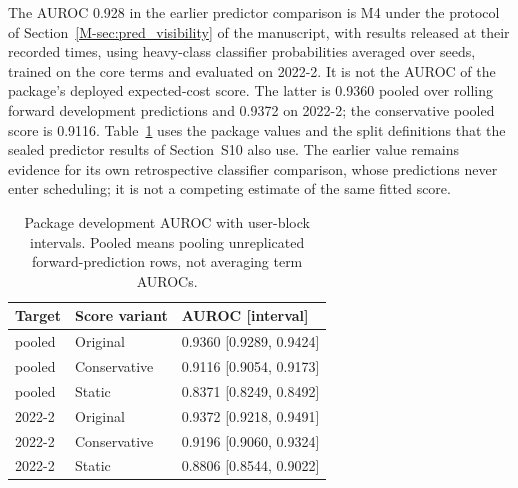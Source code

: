 \documentclass[mathematics,supfile,submit,moreauthors]{Definitions/mdpi}
\newcommand{\devnum}[1]{#1}
\begin{document}
The AUROC \devnum{0.928} in the earlier predictor comparison is M4 under the protocol
of Section~\ref*{M-sec:pred_visibility} of the manuscript, with results released at their
recorded times, using heavy-class classifier probabilities averaged
over seeds, trained on the core terms and evaluated on
\devnum{2022-2}. It is not the AUROC of the package's deployed expected-cost score.
The latter is \devnum{0.9360} pooled over rolling forward development predictions
and \devnum{0.9372} on \devnum{2022-2}; the conservative pooled score is
\devnum{0.9116}. Table~\ref{tab:s_development_predictor} uses the package values and the
split definitions that the sealed predictor results of Section~S10 also use. The earlier
value remains evidence for its own retrospective classifier comparison, whose
predictions never enter scheduling; it is not a competing estimate of the same fitted score.

\begin{table}[htbp]
\centering\small
\caption{Package development AUROC with user-block intervals. Pooled means pooling
unreplicated forward-prediction rows, not averaging term AUROCs.}
\label{tab:s_development_predictor}
\begin{tabular}{lll}
\toprule
Target & Score variant & AUROC [interval] \\
\midrule
pooled & Original & \devnum{0.9360 [0.9289, 0.9424]} \\
pooled & Conservative & \devnum{0.9116 [0.9054, 0.9173]} \\
pooled & Static & \devnum{0.8371 [0.8249, 0.8492]} \\
2022-2 & Original & \devnum{0.9372 [0.9218, 0.9491]} \\
2022-2 & Conservative & \devnum{0.9196 [0.9060, 0.9324]} \\
2022-2 & Static & \devnum{0.8806 [0.8544, 0.9022]} \\
\bottomrule
\end{tabular}
\end{table}
\end{document}
